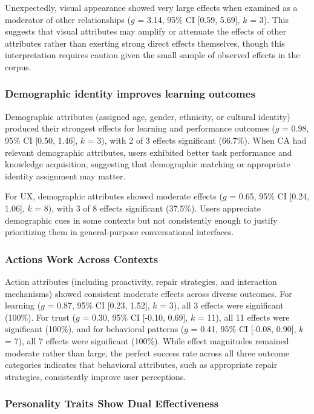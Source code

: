 \documentclass[sigconf,review,anonymous]{acmart}
\begin{document}
Unexpectedly, visual appearance showed very large effects when examined as a moderator of other relationships ($g$ = 3.14, 95\% CI [0.59, 5.69], $k$ = 3). This suggests that visual attributes may amplify or attenuate the effects of other attributes rather than exerting strong direct effects themselves, though this interpretation requires caution given the small sample of observed effects in the corpus.

\subsubsection{Demographic identity improves learning outcomes}

Demographic attributes (assigned age, gender, ethnicity, or cultural identity) produced their strongest effects for learning and performance outcomes ($g$ = 0.98, 95\% CI [0.50, 1.46], $k$ = 3), with 2 of 3 effects significant (66.7\%). When CA had relevant demographic attributes, users exhibited better task performance and knowledge acquisition, suggesting that demographic matching or appropriate identity assignment may matter.

For UX, demographic attributes showed moderate effects ($g$ = 0.65, 95\% CI [0.24, 1.06], $k$ = 8), with 3 of 8 effects significant (37.5\%). Users appreciate demographic cues in some contexts but not consistently enough to justify prioritizing them in general-purpose conversational interfaces.

\subsubsection{Actions Work Across Contexts}

Action attributes (including proactivity, repair strategies, and interaction mechanisms) showed consistent moderate effects across diverse outcomes. For learning ($g$ = 0.87, 95\% CI [0.23, 1.52], $k$ = 3), all 3 effects were significant (100\%). For trust ($g$ = 0.30, 95\% CI [-0.10, 0.69], $k$ = 11), all 11 effects were significant (100\%), and for behavioral patterns ($g$ = 0.41, 95\% CI [-0.08, 0.90], $k$ = 7), all 7 effects were significant (100\%). While effect magnitudes remained moderate rather than large, the perfect success rate across all three outcome categories indicates that behavioral attributes, such as appropriate repair strategies, consistently improve user perceptions.

\subsubsection{Personality Traits Show Dual Effectiveness}\label{sec:person}
\end{document}
